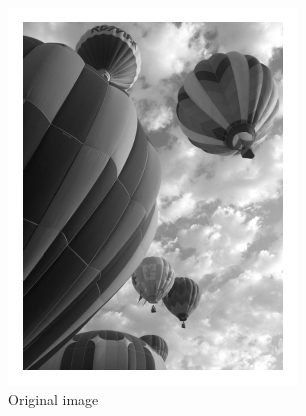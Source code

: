 \begin{figure}
\begin{minipage}[b]{.47\linewidth}
\centering
\includegraphics[width=\textwidth]{figures/balloon_gray.pdf}
\caption*{Original image}
\end{minipage}
\hspace{0.5cm}
\begin{minipage}[b]{0.47\linewidth}
\centering

\end{minipage}
\end{figure}
